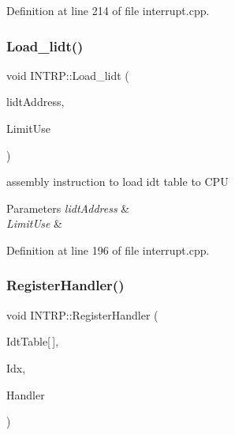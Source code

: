 Definition at line 214 of file interrupt.\+cpp.

\mbox{\label{namespace_i_n_t_r_p_a194f85d6c873615e9125466e3b23c30f}} 
\subsubsection{\texorpdfstring{Load\+\_\+lidt()}{Load\_lidt()}}
{\footnotesize\ttfamily void I\+N\+T\+R\+P\+::\+Load\+\_\+lidt (\begin{DoxyParamCaption}\item[{void $\ast$}]{lidt\+Address,  }\item[{uint16\+\_\+t}]{Limit\+Use }\end{DoxyParamCaption})\hspace{0.3cm}{\ttfamily [inline]}}



assembly instruction to load idt table to C\+PU 


\begin{DoxyParams}{Parameters}
{\em lidt\+Address} & \\
\hline
{\em Limit\+Use} & \\
\hline
\end{DoxyParams}


Definition at line 196 of file interrupt.\+cpp.

\mbox{\label{namespace_i_n_t_r_p_a91a6a2668bfa9961a9ed265f6ceac47d}} 
\subsubsection{\texorpdfstring{Register\+Handler()}{RegisterHandler()}}
{\footnotesize\ttfamily void I\+N\+T\+R\+P\+::\+Register\+Handler (\begin{DoxyParamCaption}\item[{\hyperlink{union_i_n_t_r_p_1_1_descriptor_entry}{Descriptor\+Entry}}]{Idt\+Table\mbox{[}$\,$\mbox{]},  }\item[{size\+\_\+t}]{Idx,  }\item[{\hyperlink{ktypes_8h_a46bbb9e776183ed6a8eca9d919756434}{func\+\_\+ptr}}]{Handler }\end{DoxyParamCaption})}



